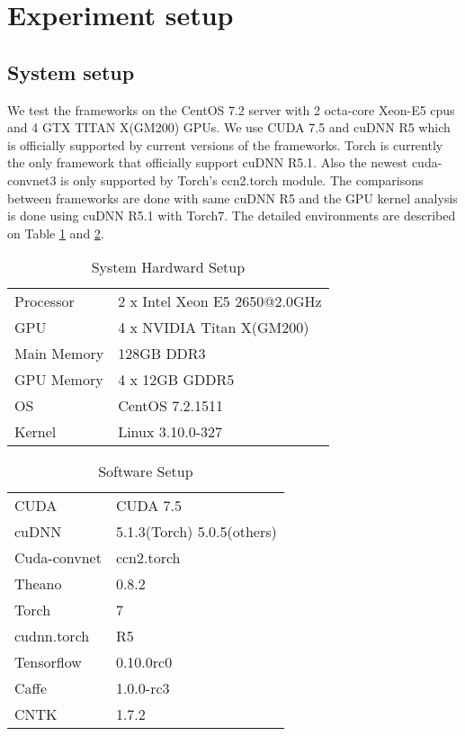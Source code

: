 \section{Experiment setup}

\subsection{System setup}
We test the frameworks on the CentOS 7.2 server with 2 octa-core Xeon-E5 cpus and 4 GTX TITAN X(GM200) GPUs.
We use CUDA 7.5 and cuDNN R5 which is officially supported by current versions of the frameworks.
Torch is currently the only framework that officially support cuDNN R5.1.
Also the newest cuda-convnet3 is only supported by Torch's ccn2.torch module.
The comparisons between frameworks are done with same cuDNN R5 and the GPU kernel analysis is done using cuDNN R5.1 with Torch7.
The detailed environments are described on Table \ref{table_system} and \ref{table_software}.

\begin{table}[]
\centering
\caption{System Hardward Setup}
\label{table_system}
\begin{tabular}{ll}
Processor   & 2 x Intel Xeon E5 2650@2.0GHz \\
GPU         & 4 x NVIDIA Titan X(GM200)     \\
Main Memory & 128GB DDR3                    \\
GPU Memory  & 4 x 12GB GDDR5                \\
OS          & CentOS 7.2.1511               \\
Kernel      & Linux 3.10.0-327             
\end{tabular}
\end{table}

\begin{table}[]
\centering
\caption{Software Setup}
\label{table_software}
\begin{tabular}{ll}
CUDA 		& CUDA 7.5 \\
cuDNN		& 5.1.3(Torch) \/ 5.0.5(others)     \\
Cuda-convnet& ccn2.torch			\\
Theano		& 0.8.2                    \\
Torch		& 7                \\
cudnn.torch	& R5		\\
Tensorflow	& 0.10.0rc0     	\\
Caffe		& 1.0.0-rc3			\\
CNTK		& 1.7.2             
\end{tabular}
\end{table}

